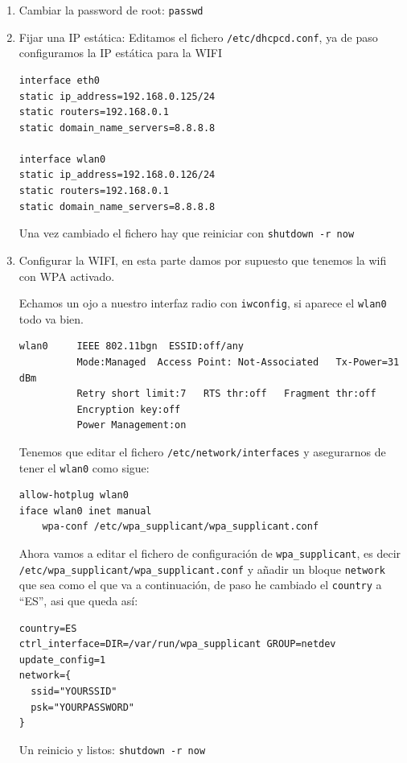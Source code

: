 \documentclass[12pt,spanish,]{scrartcl}
\begin{document}
\begin{enumerate}
\def\labelenumi{\arabic{enumi}.}
\item
  Cambiar la password de root: \texttt{passwd}
\item
  Fijar una IP estática: Editamos el fichero \texttt{/etc/dhcpcd.conf},
  ya de paso configuramos la IP estática para la WIFI

\begin{verbatim}
interface eth0
static ip_address=192.168.0.125/24
static routers=192.168.0.1
static domain_name_servers=8.8.8.8

interface wlan0
static ip_address=192.168.0.126/24
static routers=192.168.0.1
static domain_name_servers=8.8.8.8
\end{verbatim}

  Una vez cambiado el fichero hay que reiniciar con
  \texttt{shutdown\ -r\ now}
\item
  Configurar la WIFI, en esta parte damos por supuesto que tenemos la
  wifi con WPA activado.

  Echamos un ojo a nuestro interfaz radio con \texttt{iwconfig}, si
  aparece el \texttt{wlan0} todo va bien.

\begin{verbatim}
wlan0     IEEE 802.11bgn  ESSID:off/any
          Mode:Managed  Access Point: Not-Associated   Tx-Power=31 dBm
          Retry short limit:7   RTS thr:off   Fragment thr:off
          Encryption key:off
          Power Management:on
\end{verbatim}

  Tenemos que editar el fichero \texttt{/etc/network/interfaces} y
  asegurarnos de tener el \texttt{wlan0} como sigue:

\begin{verbatim}
allow-hotplug wlan0
iface wlan0 inet manual
    wpa-conf /etc/wpa_supplicant/wpa_supplicant.conf
\end{verbatim}

  Ahora vamos a editar el fichero de configuración de
  \texttt{wpa\_supplicant}, es decir
  \texttt{/etc/wpa\_supplicant/wpa\_supplicant.conf} y añadir un bloque
  \texttt{network} que sea como el que va a continuación, de paso he
  cambiado el \texttt{country} a ``ES'', asi que queda así:

\begin{verbatim}
country=ES
ctrl_interface=DIR=/var/run/wpa_supplicant GROUP=netdev
update_config=1
network={
  ssid="YOURSSID"
  psk="YOURPASSWORD"
}
\end{verbatim}

  Un reinicio y listos: \texttt{shutdown\ -r\ now}
\end{enumerate}
\end{document}
